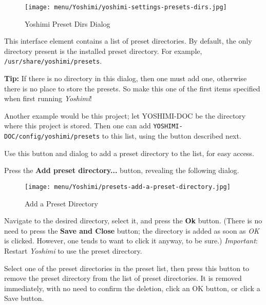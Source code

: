 \begin{figure}[H]
   \centering 
   \texttt{[image: menu/Yoshimi/yoshimi-settings-presets-dirs.jpg]}
   \caption[Preset Dirs Tab]{Yoshimi Preset Dirs Dialog}
   \label{fig:yoshimi_presets_dirs_tab}
\end{figure}

   \setcounter{ItemCounter}{0}      %

   This interface element contains a list of preset directories.
   By default, the only directory present is the installed preset directory.
   For example, \texttt{/usr/share/yoshimi/presets}.
   
   \textbf{Tip:}
   If there is no directory in this dialog, then one must
   add one, otherwise there is no place to store the presets.
   So make this one of the first items specified when first running
   \textsl{Yoshimi}!

   Another example would be this project; let YOSHIMI-DOC be the directory
   where this project is stored.  Then one can add
   \texttt{YOSHIMI-DOC/config/yoshimi/presets} to this list, using the
   button described next.

   Use this button and dialog to add a preset directory to the list, for
   easy access.

   Press the \textbf{Add preset directory...} button, revealing the
   following dialog.

\begin{figure}[H]
   \centering 
   \texttt{[image: menu/Yoshimi/presets-add-a-preset-directory.jpg]}
   \caption[Add Preset Directory]{Add a Preset Directory}
   \label{fig:presets_add_a_preset_directory}
\end{figure}

   Navigate to the desired directory, select it, and press the \textbf{Ok}
   button.  (There is no need to press the \textbf{Save and Close} button;
   the directory is added as soon as \textsl{OK} is clicked.  However, one
   tends to want to click it anyway, to be sure.)
   \textsl{Important}:  Restart \textsl{Yoshimi} to use the preset directory.

   Select one of the preset directories in the preset list, then press this
   button to remove the preset directory from the list of preset
   directories.  It is removed immediately, with no need to confirm the
   deletion, click an OK button, or click a Save button.

